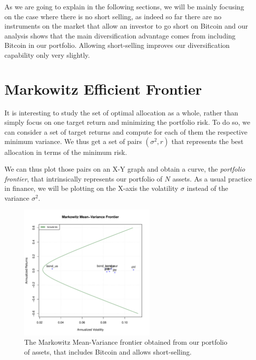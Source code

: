As we are going to explain in the following sections, we will be mainly focusing on the case where there is no short selling, as indeed so far there are no instruments on the market that allow an investor to go short on Bitcoin and our analysis shows that the main diversification advantage comes from including Bitcoin in our portfolio. Allowing short-selling improves our diversification capability only very slightly.



\section{Markowitz Efficient Frontier}
\label{sec:markowitz_frontier}

It is interesting to study the set of optimal allocation as a whole, rather than simply focus on one target return and minimizing the portfolio risk.
To do so, we can consider a set of target returns and compute for each of them the respective minimum variance. We thus get a set of pairs $(\sigma^2, r)$ that represents the best allocation in terms of the minimum risk.

We can thus plot those pairs on an X-Y graph and obtain a curve, the \textit{portfolio frontier}, that intrinsically represents our portfolio of $N$ assets.
As a usual practice in finance, we will be plotting on the X-axis the volatility $\sigma$ instead of the variance $\sigma^2$.

\begin{figure}
	\centering
	\includegraphics[width=0.6\textwidth]{Images/full_frontier.pdf}
	\caption[Full Markowitz Efficient Frontier]{The Markowitz Mean-Variance frontier obtained from our portfolio of assets, that includes Bitcoin and allows short-selling.}
	\label{fig:full_frontier}
\end{figure}

